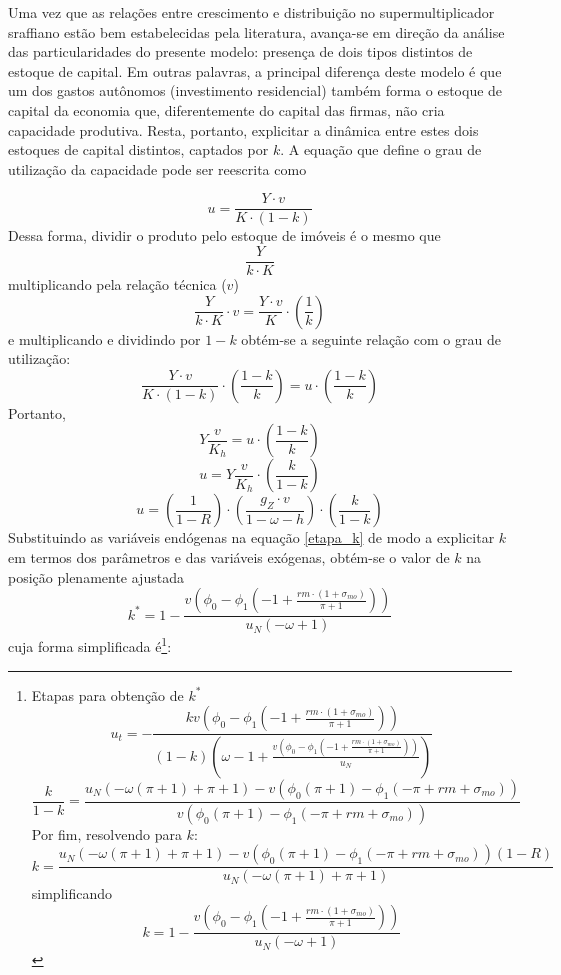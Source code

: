 Uma vez que as relações entre crescimento e distribuição no supermultiplicador sraffiano estão bem estabelecidas pela literatura, avança-se em direção da análise das particularidades do presente modelo: presença de dois tipos distintos de estoque de capital.
Em outras palavras, a principal diferença deste modelo é que um dos gastos autônomos (investimento residencial) também forma o estoque de capital da economia que, diferentemente do capital das firmas, não cria capacidade produtiva. Resta, portanto, explicitar a dinâmica entre estes dois estoques de capital distintos, captados por $k$. A equação que define o grau de utilização da capacidade pode ser reescrita como

$$
u = \frac{Y\cdot v}{K \cdot (1-k)}
$$
Dessa forma, dividir o produto pelo estoque de imóveis é o mesmo que
$$
\frac{Y}{k\cdot K}
$$
multiplicando pela relação técnica ($v$)
$$
\frac{Y}{k\cdot K}\cdot v = \frac{Y\cdot v}{K}\cdot \left(\frac{1}{k}\right)
$$
e multiplicando e dividindo por $1-k$ obtém-se a seguinte relação com o grau de utilização:
$$
\frac{Y\cdot v}{K\cdot (1-k)}\cdot \left(\frac{1-k}{k}\right) = u \cdot \left(\frac{1-k}{k}\right)
$$
Portanto,
$$
Y\frac{v}{K_h} =  u \cdot \left(\frac{1-k}{k}\right)
$$
$$
u = Y\frac{v}{K_h} \cdot \left(\frac{k}{1-k}\right)
$$
\begin{equation}
\label{etapa_k}
u = \left(\frac{1}{1-R}\right)\cdot\left(\frac{g_Z\cdot v}{1-\omega- h}\right)\cdot\left(\frac{k}{1-k}\right)
\end{equation}
Substituindo as variáveis endógenas na equação \ref{etapa_k} de modo a explicitar $k$ em termos dos parâmetros e  das variáveis exógenas, obtém-se o valor de $k$ na posição plenamente ajustada
\begin{equation}
\label{kAnali}
k^* = 1 - \frac{v \left(\phi_{0} - \phi_{1} \left(-1 + \frac{rm\cdot(1+\sigma_{mo})}{\pi + 1}\right)\right)}{u_N \left(- \omega + 1\right)}
\end{equation}
cuja forma simplificada é\footnote{Etapas para obtenção de $k^*$
	$$
	u_t = - \frac{k v \left(\phi_{0} - \phi_{1} \left(-1 + \frac{rm\cdot(1+\sigma_{mo})}{\pi + 1}\right)\right)}{\left(1 - k\right) \left(\omega - 1 + \frac{v \left(\phi_{0} - \phi_{1} \left(-1 + \frac{rm\cdot(1+\sigma_{mo})}{\pi + 1}\right)\right)}{u_N}\right)}
	$$
	$$
	\frac{k}{1 - k} = \frac{u_N \left(- \omega \left(\pi + 1\right) + \pi + 1\right) - v \left(\phi_{0} \left(\pi + 1\right) - \phi_{1} \left(- \pi + rm + \sigma_{mo}\right)\right)}{v \left(\phi_{0} \left(\pi + 1\right) - \phi_{1} \left(- \pi + rm + \sigma_{mo}\right)\right)}
	$$
	Por fim, resolvendo para $k$:
	$$
	k = \frac{u_N \left(- \omega \left(\pi + 1\right) + \pi + 1\right) - v \left(\phi_{0} \left(\pi + 1\right) - \phi_{1} \left(- \pi + rm + \sigma_{mo}\right)\right)(1-R)}{u_N \left(- \omega \left(\pi + 1\right) + \pi + 1\right)}
	$$
simplificando
$$
k = 1 - \frac{v \left(\phi_{0} - \phi_{1} \left(-1 + \frac{rm\cdot(1+\sigma_{mo})}{\pi + 1}\right)\right)}{u_N \left(- \omega + 1\right)}
$$
}:
